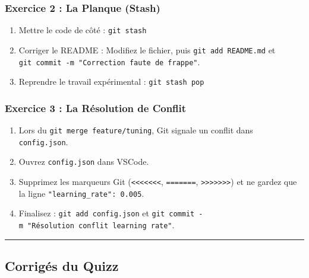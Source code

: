 \documentclass[
  letterpaper,
  DIV=11,
  numbers=noendperiod]{scrreprt}
\providecommand{\tightlist}{%
  \setlength{\itemsep}{0pt}\setlength{\parskip}{0pt}}
\begin{document}
\subsubsection{Exercice 2 : La Planque
(Stash)}\label{exercice-2-la-planque-stash-1}

\begin{enumerate}
\def\labelenumi{\arabic{enumi}.}
\tightlist
\item
  Mettre le code de côté : \texttt{git\ stash}
\item
  Corriger le README : Modifiez le fichier, puis
  \texttt{git\ add\ README.md} et
  \texttt{git\ commit\ -m\ "Correction\ faute\ de\ frappe"}.
\item
  Reprendre le travail expérimental : \texttt{git\ stash\ pop}
\end{enumerate}

\subsubsection{Exercice 3 : La Résolution de
Conflit}\label{exercice-3-la-ruxe9solution-de-conflit-1}

\begin{enumerate}
\def\labelenumi{\arabic{enumi}.}
\tightlist
\item
  Lors du \texttt{git\ merge\ feature/tuning}, Git signale un conflit
  dans \texttt{config.json}.
\item
  Ouvrez \texttt{config.json} dans VSCode.
\item
  Supprimez les marqueurs Git
  (\texttt{\textless{}\textless{}\textless{}\textless{}\textless{}\textless{}\textless{}},
  \texttt{=======},
  \texttt{\textgreater{}\textgreater{}\textgreater{}\textgreater{}\textgreater{}\textgreater{}\textgreater{}})
  et ne gardez que la ligne \texttt{"learning\_rate":\ 0.005}.
\item
  Finalisez : \texttt{git\ add\ config.json} et
  \texttt{git\ commit\ -m\ "Résolution\ conflit\ learning\ rate"}.
\end{enumerate}

\begin{center}\rule{0.5\linewidth}{0.5pt}\end{center}

\subsection{Corrigés du Quizz}\label{corriguxe9s-du-quizz}
\end{document}
